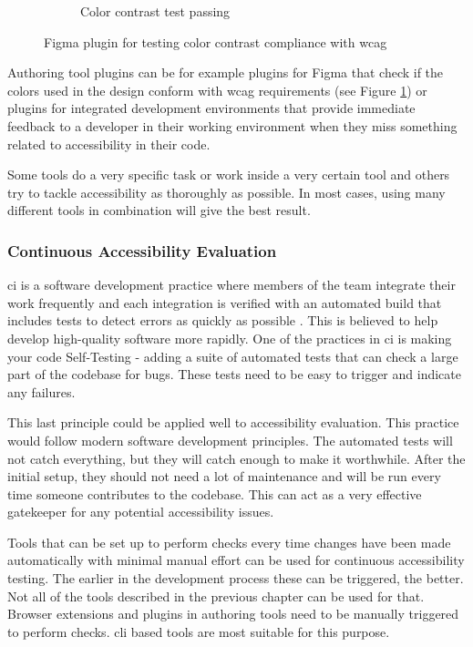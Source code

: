 \documentclass{master_thesis}
\begin{document}
\begin{figure}[ht]
\begin{subfigure}{0.4\textwidth}
		\caption{Color contrast test passing}
	\end{subfigure}
\caption{Figma plugin for testing color contrast compliance with \ac{wcag}}
\label{fig:figma-plugin}
\end{figure}

Authoring tool plugins can be for example plugins for Figma that check if the colors used in the design conform with \ac{wcag} requirements (see Figure \ref{fig:figma-plugin}) or plugins for integrated development environments that provide immediate feedback to a developer in their working environment when they miss something related to accessibility in their code.

Some tools do a very specific task or work inside a very certain tool and others try to tackle accessibility as thoroughly as possible. In most cases, using many different tools in combination will give the best result.

\subsubsection{Continuous Accessibility Evaluation} \label{continuous-a11y-evaluation}

\Ac{ci} is a software development practice where members of the team integrate their work frequently and each integration is verified with an automated build that includes tests to detect errors as quickly as possible \citep{Fowler2006}. This is believed to help develop high-quality software more rapidly. One of the practices in \ac{ci} is making your code Self-Testing - adding a suite of automated tests that can check a large part of the codebase for bugs. These tests need to be easy to trigger and indicate any failures.

This last principle could be applied well to accessibility evaluation. This practice would follow modern software development principles. The automated tests will not catch everything, but they will catch enough to make it worthwhile. After the initial setup, they should not need a lot of maintenance and will be run every time someone contributes to the codebase. This can act as a very effective gatekeeper for any potential accessibility issues.

Tools that can be set up to perform checks every time changes have been made automatically with minimal manual effort can be used for continuous accessibility testing. The earlier in the development process these can be triggered, the better. Not all of the tools described in the previous chapter can be used for that. Browser extensions and plugins in authoring tools need to be manually triggered to perform checks. \ac{cli} based tools are most suitable for this purpose.
\end{document}
